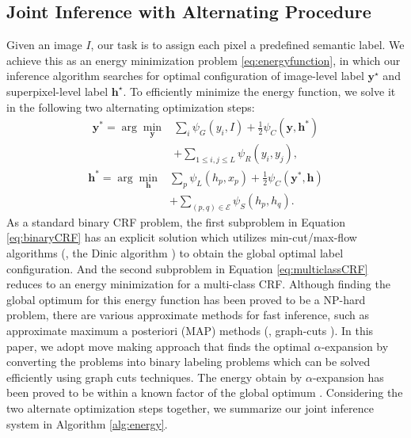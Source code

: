 \subsection{Joint Inference with Alternating Procedure}
\label{sec:inference}
Given an image $I$, our task is to assign each pixel a predefined semantic label.
We achieve this as an energy minimization problem \eqref{eq:energyfunction}, in which our inference algorithm searches for optimal configuration of image-level label $\boldsymbol{y}^\star$ and superpixel-level label $\boldsymbol{h}^\star$.
To efficiently minimize the energy function, we solve it in the following two alternating optimization steps:
\begin{equation}
    \label{eq:binaryCRF}
    \begin{aligned}
        \boldsymbol{y}^* = \arg\min_{\boldsymbol{y}} &\sum_{i} {\psi_{G}(y_i,I)} + \frac{1}{2} \psi_{C}(\boldsymbol{y},\boldsymbol{h}^*) \\ &+ \sum_{1 \le i,j \le L} {\psi_{R}(y_i,y_j)},
    \end{aligned}
\end{equation}
\begin{equation}
    \label{eq:multiclassCRF}
    \begin{aligned}
        \boldsymbol{h}^* = \arg\min_{\boldsymbol{h}} &\sum_{p} {\psi_{L}(h_p,x_p)} + \frac{1}{2} \psi_{C}(\boldsymbol{y}^*,\boldsymbol{h}) \\ &+ \sum_{(p,q) \in \mathcal{E}}{\psi_{S}(h_p,h_q)}.
    \end{aligned}
\end{equation}
As a standard binary CRF problem, the first subproblem in Equation \eqref{eq:binaryCRF} has an explicit solution which utilizes min-cut/max-flow algorithms (\eg, the Dinic algorithm \cite{dinits1970algorithm}) to obtain the global optimal label configuration.
And the second subproblem in Equation \eqref{eq:multiclassCRF} reduces to an energy minimization for a multi-class CRF.
Although finding the global optimum for this energy function has been proved to be a NP-hard problem, there are various approximate methods for fast inference, such as approximate maximum a posteriori (MAP) methods (\eg, graph-cuts \cite{boykov2001fast}).
In this paper, we adopt move making approach \cite{boykov2001fast} that finds the optimal $\alpha$-expansion \cite{boykov2001fast,kolmogorov2004energy} by converting the problems into binary labeling  problems which can be solved efficiently using graph cuts techniques.
The energy obtain by $\alpha$-expansion has been proved to be within a known factor of the global optimum \cite{boykov2001fast}. Considering the two alternate optimization steps together, we summarize our joint inference system in Algorithm \ref{alg:energy}.


